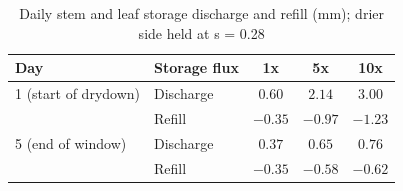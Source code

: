 \begin{table}[H]
\centering
\caption{Daily stem and leaf storage discharge and refill (mm); drier side held at s = 0.28}
\label{tab:vwt_s2_one_daily_storage}
\begin{tabular}{llccc}
\hline
Day & Storage flux & 1x & 5x & 10x \\
\hline
1 (start of drydown) & Discharge & $0.60$ & $2.14$ & $3.00$ \\
 & Refill & $-0.35$ & $-0.97$ & $-1.23$ \\
\hline
5 (end of window) & Discharge & $0.37$ & $0.65$ & $0.76$ \\
 & Refill & $-0.35$ & $-0.58$ & $-0.62$ \\
\hline
\end{tabular}
\end{table}
